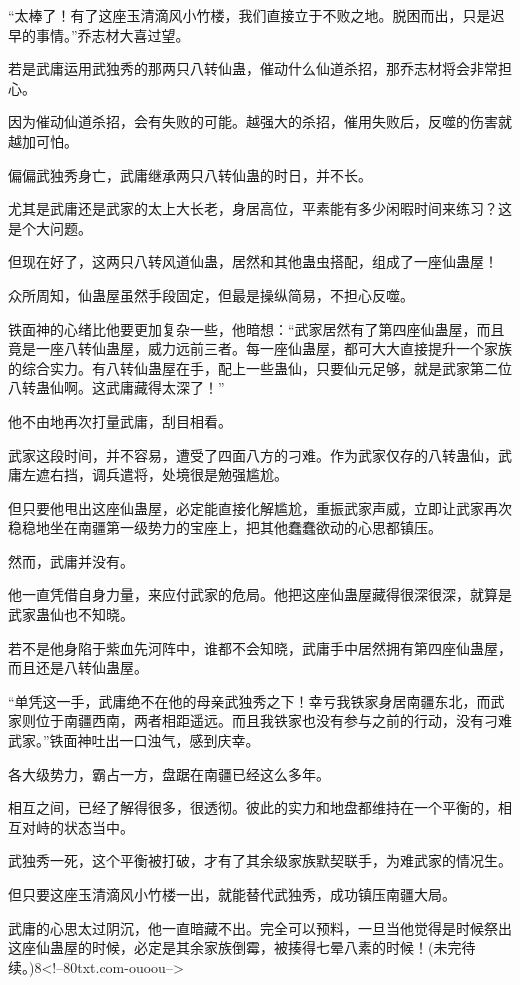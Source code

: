 \begin{this_body}
“太棒了！有了这座玉清滴风小竹楼，我们直接立于不败之地。脱困而出，只是迟早的事情。”乔志材大喜过望。

若是武庸运用武独秀的那两只八转仙蛊，催动什么仙道杀招，那乔志材将会非常担心。

因为催动仙道杀招，会有失败的可能。越强大的杀招，催用失败后，反噬的伤害就越加可怕。

偏偏武独秀身亡，武庸继承两只八转仙蛊的时日，并不长。

尤其是武庸还是武家的太上大长老，身居高位，平素能有多少闲暇时间来练习？这是个大问题。

但现在好了，这两只八转风道仙蛊，居然和其他蛊虫搭配，组成了一座仙蛊屋！

众所周知，仙蛊屋虽然手段固定，但最是操纵简易，不担心反噬。

铁面神的心绪比他要更加复杂一些，他暗想：“武家居然有了第四座仙蛊屋，而且竟是一座八转仙蛊屋，威力远前三者。每一座仙蛊屋，都可大大直接提升一个家族的综合实力。有八转仙蛊屋在手，配上一些蛊仙，只要仙元足够，就是武家第二位八转蛊仙啊。这武庸藏得太深了！”

他不由地再次打量武庸，刮目相看。

武家这段时间，并不容易，遭受了四面八方的刁难。作为武家仅存的八转蛊仙，武庸左遮右挡，调兵遣将，处境很是勉强尴尬。

但只要他甩出这座仙蛊屋，必定能直接化解尴尬，重振武家声威，立即让武家再次稳稳地坐在南疆第一级势力的宝座上，把其他蠢蠢欲动的心思都镇压。

然而，武庸并没有。

他一直凭借自身力量，来应付武家的危局。他把这座仙蛊屋藏得很深很深，就算是武家蛊仙也不知晓。

若不是他身陷于紫血先河阵中，谁都不会知晓，武庸手中居然拥有第四座仙蛊屋，而且还是八转仙蛊屋。

“单凭这一手，武庸绝不在他的母亲武独秀之下！幸亏我铁家身居南疆东北，而武家则位于南疆西南，两者相距遥远。而且我铁家也没有参与之前的行动，没有刁难武家。”铁面神吐出一口浊气，感到庆幸。

各大级势力，霸占一方，盘踞在南疆已经这么多年。

相互之间，已经了解得很多，很透彻。彼此的实力和地盘都维持在一个平衡的，相互对峙的状态当中。

武独秀一死，这个平衡被打破，才有了其余级家族默契联手，为难武家的情况生。

但只要这座玉清滴风小竹楼一出，就能替代武独秀，成功镇压南疆大局。

武庸的心思太过阴沉，他一直暗藏不出。完全可以预料，一旦当他觉得是时候祭出这座仙蛊屋的时候，必定是其余家族倒霉，被揍得七晕八素的时候！(未完待续。)8<!--80txt.com-ouoou-->

\end{this_body}

